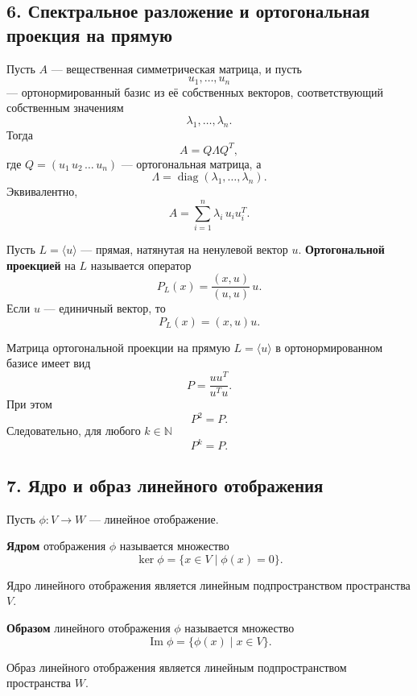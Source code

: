 \subsection*{6. Спектральное разложение и ортогональная проекция на прямую}

\begin{theorem}
Пусть $A$ — вещественная симметрическая матрица, и пусть
\[
u_1,\dots,u_n
\]
— ортонормированный базис из её собственных векторов, соответствующий собственным значениям
\[
\lambda_1,\dots,\lambda_n.
\]
Тогда
\[
A = Q\Lambda Q^T,
\]
где $Q = (u_1\,u_2\,\dots\,u_n)$ — ортогональная матрица, а
\[
\Lambda = \operatorname{diag}(\lambda_1,\dots,\lambda_n).
\]
Эквивалентно,
\[
A = \sum_{i=1}^n \lambda_i\,u_i u_i^T.
\]
\end{theorem}

\begin{definition}
Пусть $L=\langle u\rangle$ — прямая, натянутая на ненулевой вектор $u$.
\textbf{Ортогональной проекцией} на $L$ называется оператор
\[
P_L(x)=\frac{(x,u)}{(u,u)}\,u.
\]
Если $u$ — единичный вектор, то
\[
P_L(x)=(x,u)u.
\]
\end{definition}

Матрица ортогональной проекции на прямую $L=\langle u\rangle$ в ортонормированном базисе имеет вид
\[
P=\frac{uu^T}{u^Tu}.
\]
При этом
\[
P^2=P.
\]
Следовательно, для любого $k\in\mathbb{N}$
\[
P^k=P.
\]

\subsection*{7. Ядро и образ линейного отображения}

\begin{definition}
Пусть $\phi : V \to W$ — линейное отображение.

\textbf{Ядром} отображения $\phi$ называется множество
\[
\ker\phi=\{x\in V\mid \phi(x)=0\}.
\]
\end{definition}

Ядро линейного отображения является линейным подпространством пространства $V$.

\begin{definition}
\textbf{Образом} линейного отображения $\phi$ называется множество
\[
\operatorname{Im}\phi=\{\phi(x)\mid x\in V\}.
\]
\end{definition}

Образ линейного отображения является линейным подпространством пространства $W$.

